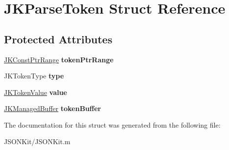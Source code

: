 \hypertarget{struct_j_k_parse_token}{\section{J\+K\+Parse\+Token Struct Reference}
\label{struct_j_k_parse_token}
}
\subsection*{Protected Attributes}
\begin{DoxyCompactItemize}
\item 
\hypertarget{struct_j_k_parse_token_a435901def67b18cedd8ac6c3ab593e0e}{\hyperlink{struct_j_k_const_ptr_range}{J\+K\+Const\+Ptr\+Range} {\bfseries token\+Ptr\+Range}}\label{struct_j_k_parse_token_a435901def67b18cedd8ac6c3ab593e0e}

\item 
\hypertarget{struct_j_k_parse_token_abafcf1667d5f2c7aebe4594cff2170fe}{J\+K\+Token\+Type {\bfseries type}}\label{struct_j_k_parse_token_abafcf1667d5f2c7aebe4594cff2170fe}

\item 
\hypertarget{struct_j_k_parse_token_aa961078ffa70513ad240af905ce3fd71}{\hyperlink{struct_j_k_token_value}{J\+K\+Token\+Value} {\bfseries value}}\label{struct_j_k_parse_token_aa961078ffa70513ad240af905ce3fd71}

\item 
\hypertarget{struct_j_k_parse_token_a0da21fecd02b19d8bc53bb62b4c99e2a}{\hyperlink{struct_j_k_managed_buffer}{J\+K\+Managed\+Buffer} {\bfseries token\+Buffer}}\label{struct_j_k_parse_token_a0da21fecd02b19d8bc53bb62b4c99e2a}

\end{DoxyCompactItemize}


The documentation for this struct was generated from the following file\+:\begin{DoxyCompactItemize}
\item 
J\+S\+O\+N\+Kit/J\+S\+O\+N\+Kit.\+m\end{DoxyCompactItemize}
